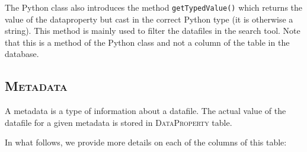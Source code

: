 \documentclass{report}
\begin{document}
	The Python class also introduces the method \texttt{getTypedValue()} which returns the value of the dataproperty but cast in the correct Python type (it is otherwise a string). This method is mainly used to filter the datafiles in the search tool. Note that this is a method of the Python class and not a column of the table in the database.
	
	\subsection*{\faDatabase{} \textsc{Metadata}}
	
	A metadata is a type of information about a datafile. The actual value of the datafile for a given metadata is stored in \textsc{DataProperty} table.
	
	In what follows, we provide more details on each of the columns of this table:
\end{document}

